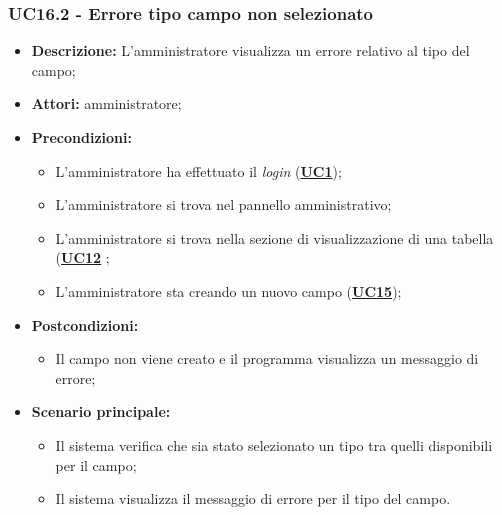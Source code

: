 \subsubsection{UC16.2 - Errore tipo campo non selezionato}
\label{sec:UC16.2}
\begin{itemize}
	\item \textbf{Descrizione:} L’amministratore visualizza un errore relativo al tipo del campo;
	\item \textbf{Attori:} amministratore;
	\item \textbf{Precondizioni:} 
	\begin{itemize}
		\item L’amministratore ha effettuato il \textit{login} (\hyperref[sec:UC1]{\textbf{UC1}});
		\item L’amministratore si trova nel pannello amministrativo;
		\item L’amministratore si trova nella sezione di visualizzazione di una tabella (\hyperref[sec:UC12]{\textbf{UC12}} ;
		\item L’amministratore sta creando un nuovo campo (\hyperref[sec:UC15]{\textbf{UC15}});
	\end{itemize}
	\item \textbf{Postcondizioni:} 
	\begin{itemize}
		\item Il campo non viene creato e il programma visualizza un messaggio di errore;
	\end{itemize}
	\item \textbf{Scenario principale:} 
	\begin{itemize}
		\item Il sistema verifica che sia stato selezionato un tipo tra quelli disponibili per il campo;
		\item Il sistema visualizza il messaggio di errore per il tipo del campo.
	\end{itemize}
\end{itemize}


